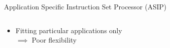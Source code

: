 \documentclass{beamer}
\begin{document}
\begin{CJK}{UTF8}{bkai}
\begin{frame}{Application Specific Instruction Set Processor (ASIP)}
\begin{columns}
\begin{column}{0.55\textwidth}
\begin{itemize}
{\begin{itemize}
                                    \item Fitting particular applications only \\ $\implies$ Poor flexibility
                                \end{itemize}
                                }
                        \end{itemize} 
                    \end{column}
                \end{columns} 
            \end{frame}


\end{CJK}
\end{document}
